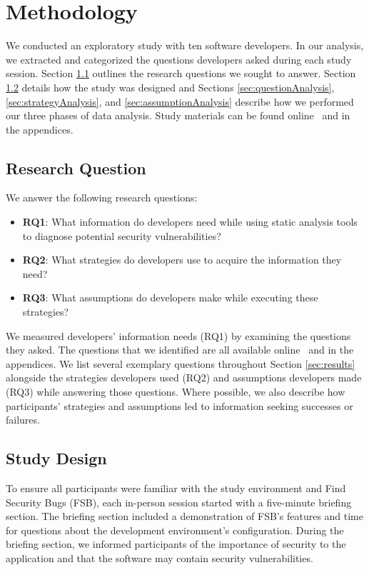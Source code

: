 \documentclass[10pt,journal,compsoc]{IEEEtran}
\begin{document}


\section{Methodology}
\label{sec:meth}
We conducted an exploratory study with ten software developers. In our analysis, we extracted and categorized the questions developers asked during each study session. 
Section \ref{rqs} outlines the research questions we sought to answer. 
Section \ref{studyDesign} details how the study was designed and Sections \ref{sec:questionAnalysis}, \ref{sec:strategyAnalysis}, and \ref{sec:assumptionAnalysis} describe how we performed our three phases of data analysis.
Study materials can be found online~\cite{ExperimentalMaterials} and in the appendices.

\subsection{Research Question}
\label{rqs}
We answer the following research questions:
\begin{itemize}
	\item \textbf{RQ1}: What information do developers need while using static analysis tools to diagnose potential security vulnerabilities? 
	\item \textbf{RQ2}: What strategies do developers use to acquire the information they need?
	\item \textbf{RQ3}: What assumptions do developers make while executing these strategies?
	\end{itemize}
We measured developers' information needs (RQ1) by examining the questions they asked.
The questions that we identified are all available online~\cite{ExperimentalMaterials} and in the appendices.
We list several exemplary questions throughout Section \ref{sec:results} alongside the strategies developers used (RQ2) and assumptions developers made (RQ3) while answering those questions.
Where possible, we also describe how participants' strategies and assumptions led to information seeking successes or failures.


\subsection{Study Design}
\label{studyDesign}
To ensure all participants were familiar with the study environment and Find Security Bugs (FSB),
each in-person session started with a five-minute briefing section.
The briefing section included a demonstration of FSB's features and time for questions about the development environment's configuration.
During the briefing section, we informed participants of the importance of security to the application and that the software may contain security vulnerabilities.
\end{document}
